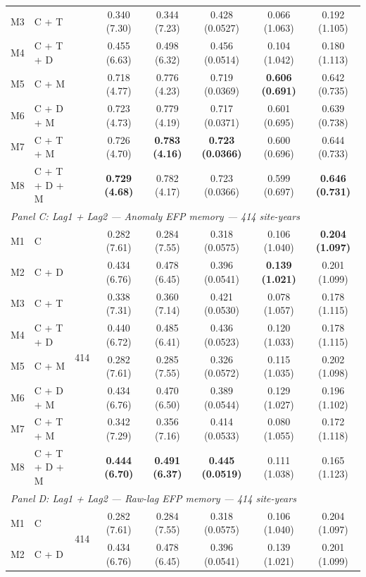\begin{table}[htbp]
\begin{tabular}{llcccccc}
M3 & C + T &  & 0.340 (7.30) & 0.344 (7.23) & 0.428 (0.0527) & 0.066 (1.063) & 0.192 (1.105) \\
M4 & C + T + D &  & 0.455 (6.63) & 0.498 (6.32) & 0.456 (0.0514) & 0.104 (1.042) & 0.180 (1.113) \\
M5 & C + M &  & 0.718 (4.77) & 0.776 (4.23) & 0.719 (0.0369) & \textbf{0.606 (0.691)} & 0.642 (0.735) \\
M6 & C + D + M &  & 0.723 (4.73) & 0.779 (4.19) & 0.717 (0.0371) & 0.601 (0.695) & 0.639 (0.738) \\
M7 & C + T + M &  & 0.726 (4.70) & \textbf{0.783 (4.16)} & \textbf{0.723 (0.0366)} & 0.600 (0.696) & 0.644 (0.733) \\
M8 & C + T + D + M &  & \textbf{0.729 (4.68)} & 0.782 (4.17) & 0.723 (0.0366) & 0.599 (0.697) & \textbf{0.646 (0.731)} \\
\midrule
\multicolumn{8}{l}{\textit{Panel C: Lag1 + Lag2 --- Anomaly EFP memory --- 414 site-years}} \\
\midrule
M1 & C & \multirow{8}{*}{414} & 0.282 (7.61) & 0.284 (7.55) & 0.318 (0.0575) & 0.106 (1.040) & \textbf{0.204 (1.097)} \\
M2 & C + D &  & 0.434 (6.76) & 0.478 (6.45) & 0.396 (0.0541) & \textbf{0.139 (1.021)} & 0.201 (1.099) \\
M3 & C + T &  & 0.338 (7.31) & 0.360 (7.14) & 0.421 (0.0530) & 0.078 (1.057) & 0.178 (1.115) \\
M4 & C + T + D &  & 0.440 (6.72) & 0.485 (6.41) & 0.436 (0.0523) & 0.120 (1.033) & 0.178 (1.115) \\
M5 & C + M &  & 0.282 (7.61) & 0.285 (7.55) & 0.326 (0.0572) & 0.115 (1.035) & 0.202 (1.098) \\
M6 & C + D + M &  & 0.434 (6.76) & 0.470 (6.50) & 0.389 (0.0544) & 0.129 (1.027) & 0.196 (1.102) \\
M7 & C + T + M &  & 0.342 (7.29) & 0.356 (7.16) & 0.414 (0.0533) & 0.080 (1.055) & 0.172 (1.118) \\
M8 & C + T + D + M &  & \textbf{0.444 (6.70)} & \textbf{0.491 (6.37)} & \textbf{0.445 (0.0519)} & 0.111 (1.038) & 0.165 (1.123) \\
\midrule
\multicolumn{8}{l}{\textit{Panel D: Lag1 + Lag2 --- Raw-lag EFP memory --- 414 site-years}} \\
\midrule
M1 & C & \multirow{8}{*}{414} & 0.282 (7.61) & 0.284 (7.55) & 0.318 (0.0575) & 0.106 (1.040) & 0.204 (1.097) \\
M2 & C + D &  & 0.434 (6.76) & 0.478 (6.45) & 0.396 (0.0541) & 0.139 (1.021) & 0.201 (1.099) \\

\end{tabular}
\end{table}
